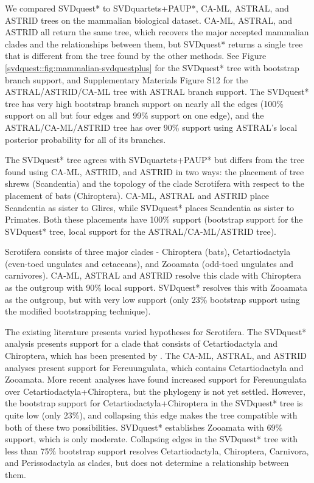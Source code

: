 We compared SVDquest* to  SVDquartets+PAUP*, CA-ML, ASTRAL, and ASTRID trees
on the mammalian biological dataset.
CA-ML, ASTRAL, and ASTRID all return the same tree, 
which recovers the major accepted mammalian clades and
the relationships between them, but SVDquest* 
 {returns a  single tree that is different from the tree found
 by the other methods.}
 {See Figure \ref{svdquest::fig:mammalian-svdquestplus} for the SVDquest* tree with bootstrap branch support, and Supplementary Materials Figure S12 for the ASTRAL/ASTRID/CA-ML tree with ASTRAL branch support. }
 The SVDquest* tree has very high bootstrap branch support on
nearly all the edges (100\% support on all but four edges and 99\% support on one edge), and the ASTRAL/CA-ML/ASTRID tree has over 90\% support using ASTRAL's local posterior probability for all of its branches.


 

The SVDquest* tree  agrees with SVDquartets+PAUP*  but differs from
the tree found using CA-ML, ASTRID, and ASTRID in two ways: the placement of tree shrews
(Scandentia) and the topology of the clade Scrotifera with respect to
the placement of bats (Chiroptera).
CA-ML, ASTRAL and ASTRID place
Scandentia as sister to Glires, while SVDquest* places Scandentia as
sister to Primates. 
Both these placements have 100\% support 
(bootstrap support for the SVDquest* tree,
local support for the ASTRAL/CA-ML/ASTRID tree). 


Scrotifera consists of three major clades - Chiroptera (bats),
Cetartiodactyla (even-toed ungulates and cetaceans), and Zooamata
(odd-toed ungulates and carnivores). 
CA-ML, ASTRAL and ASTRID resolve
this clade with Chiroptera as the outgroup with 90\% local
support. SVDquest* resolves this with Zooamata as the outgroup, but
with very low support (only 23\% bootstrap support using the modified bootstrapping technique).

The existing literature presents varied hypotheses for Scrotifera. The
SVDquest* analysis presents support for a clade that consists of
Cetartiodactyla and Chiroptera, which has been presented by
\cite{hou2009phylogeny}. 
The CA-ML, ASTRAL, and ASTRID analyses
present support for Fereuungulata, which contains Cetartiodactyla and
Zooamata. 
More recent analyses \cite{zhou2012phylogenomic} have found
increased support for Fereuungulata over Cetartiodactyla+Chiroptera,
but the phylogeny is not yet settled.  However, the bootstrap support
for Cetartiodactyla+Chiroptera in the SVDquest* tree is quite low
(only 23\%), and collapsing this edge makes the tree compatible with
both of these two possibilities.  
SVDquest* establishes
Zooamata with 69\% support, which is only moderate. Collapsing
edges in the SVDquest* tree with less than 75\% bootstrap support 
resolves Cetartiodactyla,
Chiroptera, Carnivora, and Perissodactyla as clades, but does not
determine a relationship between them.


